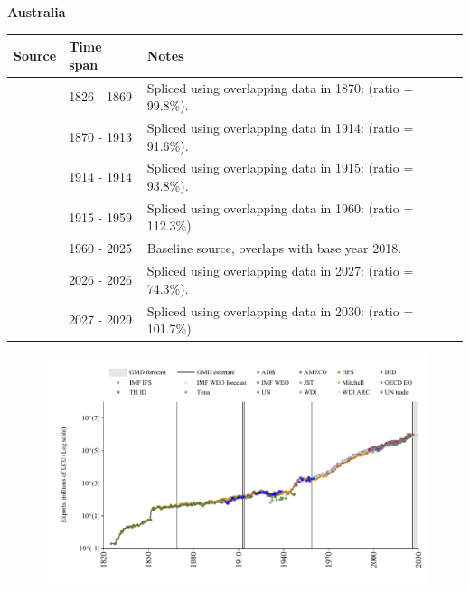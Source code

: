 \documentclass[12pt,a4paper,landscape]{article}
\begin{document}
\begin{adjustbox}{max totalsize={\paperwidth}{\paperheight},center}
\begin{minipage}[t][\textheight][t]{\textwidth}
\vspace*{0.5cm}
{}
\begin{center}
{\Large\bfseries Australia}
\end{center}
\vspace{0.5cm}
\begin{table}[H]
\centering
\small
\begin{tabular}{|l|l|l|}
\hline
\textbf{Source} & \textbf{Time span} & \textbf{Notes} \\
\hline
\rowcolor{white}\cite{Tena}& 1826 - 1869 &Spliced using overlapping data in 1870: (ratio = 99.8\%).\\
\rowcolor{lightgray}\cite{JST}& 1870 - 1913 &Spliced using overlapping data in 1914: (ratio = 91.6\%).\\
\rowcolor{white}\cite{Tena}& 1914 - 1914 &Spliced using overlapping data in 1915: (ratio = 93.8\%).\\
\rowcolor{lightgray}\cite{JST}& 1915 - 1959 &Spliced using overlapping data in 1960: (ratio = 112.3\%).\\
\rowcolor{white}\cite{OECD_EO}& 1960 - 2025 &Baseline source, overlaps with base year 2018.\\
\rowcolor{lightgray}\cite{AMECO}& 2026 - 2026 &Spliced using overlapping data in 2027: (ratio = 74.3\%).\\
\rowcolor{white}\cite{IMF_WEO_forecast}& 2027 - 2029 &Spliced using overlapping data in 2030: (ratio = 101.7\%).\\
\hline
\end{tabular}
\end{table}
\begin{figure}[H]
\centering
\includegraphics[width=\textwidth,height=0.6\textheight,keepaspectratio]{graphs/AUS_exports.pdf}
\end{figure}
\end{minipage}
\end{adjustbox}
\end{document}
